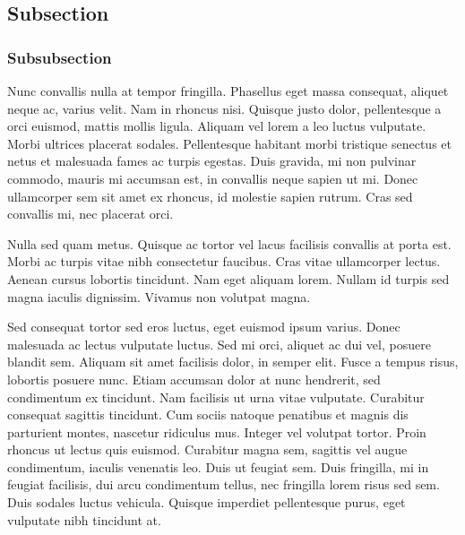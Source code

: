 \documentclass[12pt,letterpaper,]{article}
\begin{document}
\subsection{Subsection}\label{subsection-1}

\subsubsection{Subsubsection}\label{subsubsection-1}

Nunc convallis nulla at tempor fringilla. Phasellus eget massa
consequat, aliquet neque ac, varius velit. Nam in rhoncus nisi. Quisque
justo dolor, pellentesque a orci euismod, mattis mollis ligula. Aliquam
vel lorem a leo luctus vulputate. Morbi ultrices placerat sodales.
Pellentesque habitant morbi tristique senectus et netus et malesuada
fames ac turpis egestas. Duis gravida, mi non pulvinar commodo, mauris
mi accumsan est, in convallis neque sapien ut mi. Donec ullamcorper sem
sit amet ex rhoncus, id molestie sapien rutrum. Cras sed convallis mi,
nec placerat orci.

Nulla sed quam metus. Quisque ac tortor vel lacus facilisis convallis at
porta est. Morbi ac turpis vitae nibh consectetur faucibus. Cras vitae
ullamcorper lectus. Aenean cursus lobortis tincidunt. Nam eget aliquam
lorem. Nullam id turpis sed magna iaculis dignissim. Vivamus non
volutpat magna.

Sed consequat tortor sed eros luctus, eget euismod ipsum varius. Donec
malesuada ac lectus vulputate luctus. Sed mi orci, aliquet ac dui vel,
posuere blandit sem. Aliquam sit amet facilisis dolor, in semper elit.
Fusce a tempus risus, lobortis posuere nunc. Etiam accumsan dolor at
nunc hendrerit, sed condimentum ex tincidunt. Nam facilisis ut urna
vitae vulputate. Curabitur consequat sagittis tincidunt. Cum sociis
natoque penatibus et magnis dis parturient montes, nascetur ridiculus
mus. Integer vel volutpat tortor. Proin rhoncus ut lectus quis euismod.
Curabitur magna sem, sagittis vel augue condimentum, iaculis venenatis
leo. Duis ut feugiat sem. Duis fringilla, mi in feugiat facilisis, dui
arcu condimentum tellus, nec fringilla lorem risus sed sem. Duis sodales
luctus vehicula. Quisque imperdiet pellentesque purus, eget vulputate
nibh tincidunt at.
\end{document}
